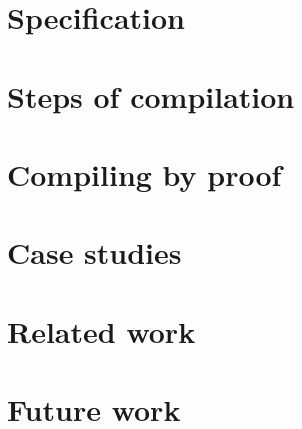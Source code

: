 \documentclass{llncs}
\begin{document}
\section{Specification}
\label{secSpecification}


\section{Steps of compilation}
\label{secImplementation}


\section{Compiling by proof}
\label{secCompilingByProof}


\section{Case studies}
\label{secCaseStudy}



\section{Related work}
\label{secRelatedWork}



\section{Future work}
\label{secFutureWork}






\end{document}
